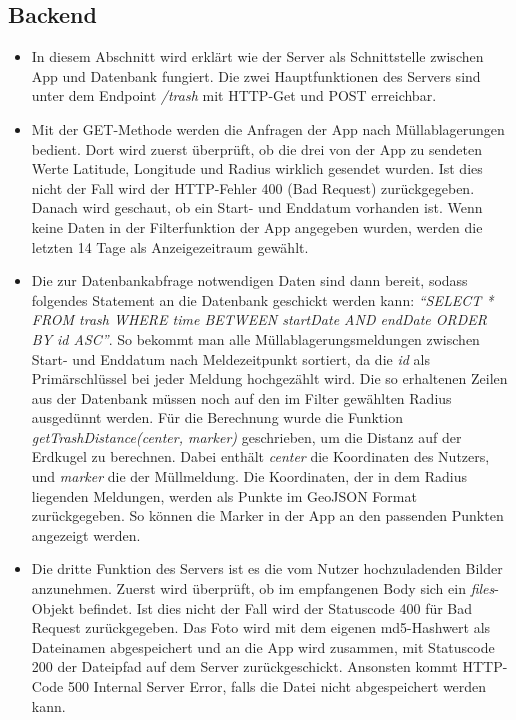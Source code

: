 \documentclass[a4paper, 11pt, DIV=11, listof=numbered, numbers=noenddot]{scrartcl}
\begin{document}
	\subsection{Backend}
	\begin {itemize}
		\item In diesem Abschnitt wird erklärt wie der Server als Schnittstelle zwischen App und Datenbank fungiert. Die zwei Hauptfunktionen des Servers sind unter dem Endpoint \textit{/trash} mit HTTP-Get und POST erreichbar.
		\item Mit der GET-Methode werden die Anfragen der App nach Müllablagerungen bedient. Dort wird zuerst überprüft, ob die drei von der App zu sendeten Werte Latitude, Longitude und Radius wirklich gesendet wurden. Ist dies nicht der Fall wird der HTTP-Fehler 				400 (Bad Request) zurückgegeben. Danach wird geschaut, ob ein Start- und Enddatum vorhanden ist. Wenn keine Daten in der Filterfunktion der App angegeben wurden, werden die letzten 14 Tage als Anzeigezeitraum gewählt.
		\item Die zur Datenbankabfrage notwendigen Daten sind dann bereit, sodass folgendes Statement an die Datenbank geschickt werden kann:\textit{ “SELECT * FROM trash WHERE time BETWEEN startDate AND endDate ORDER BY id ASC”}. So bekommt man alle 				Müllablagerungsmeldungen zwischen Start- und Enddatum nach Meldezeitpunkt sortiert, da die \textit {id} als Primärschlüssel bei jeder Meldung hochgezählt wird.
			Die so erhaltenen Zeilen aus der Datenbank müssen noch auf den im Filter gewählten Radius ausgedünnt werden. Für die Berechnung wurde die Funktion \textit{getTrashDistance(center, marker)} geschrieben, um die Distanz auf der Erdkugel zu berechnen. 				Dabei enthält \textit{center} die Koordinaten des Nutzers, und \textit{marker} die der Müllmeldung. Die Koordinaten, der in dem Radius liegenden Meldungen, werden als Punkte im GeoJSON Format zurückgegeben. So können die Marker in der App an den 				passenden Punkten angezeigt werden.
		\item Die dritte Funktion des Servers ist es die vom Nutzer hochzuladenden Bilder anzunehmen. Zuerst wird überprüft, ob im empfangenen Body sich ein \textit{files}-Objekt befindet. Ist dies nicht der Fall wird der Statuscode 400 für Bad Request 							zurückgegeben. Das Foto wird mit dem eigenen md5-Hashwert als Dateinamen abgespeichert und an die App wird zusammen, mit Statuscode 200 der Dateipfad auf dem Server zurückgeschickt. Ansonsten kommt HTTP-Code 500 Internal Server Error, falls die 				Datei nicht abgespeichert werden kann.
	\end {itemize}
	                     
	\printbibliography
\end{document}
